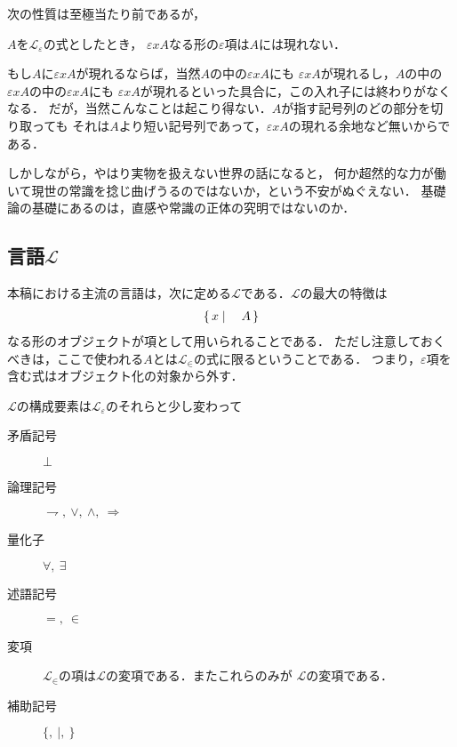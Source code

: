 	次の性質は至極当たり前であるが，
	
	\begin{screen}
		\begin{metathm}[無限入れ子は起こらない]
			$A$を$\mathcal{L}_{\varepsilon}$の式としたとき，
			$\varepsilon x A$なる形の$\varepsilon$項は$A$には現れない．
		\end{metathm}
	\end{screen}
	
	もし$A$に$\varepsilon x A$が現れるならば，当然$A$の中の$\varepsilon x A$にも
	$\varepsilon x A$が現れるし，$A$の中の$\varepsilon x A$の中の$\varepsilon x A$にも
	$\varepsilon x A$が現れるといった具合に，この入れ子には終わりがなくなる．
	だが，当然こんなことは起こり得ない．$A$が指す記号列のどの部分を切り取っても
	それは$A$より短い記号列であって，$\varepsilon x A$の現れる余地など無いからである．
	
	しかしながら，やはり実物を扱えない世界の話になると，
	何か超然的な力が働いて現世の常識を捻じ曲げうるのではないか，という不安がぬぐえない．
	基礎論の基礎にあるのは，直感や常識の正体の究明ではないのか．
	
\subsection{言語$\mathcal{L}$}
	本稿における主流の言語は，次に定める$\mathcal{L}$である．$\mathcal{L}$の最大の特徴は
	\begin{align}
		\left\{\, x \mid \quad A\, \right\}
	\end{align}
	なる形のオブジェクトが項として用いられることである．
	ただし注意しておくべきは，ここで使われる$A$とは$\mathcal{L}_{\in}$の式に限るということである．
	つまり，$\varepsilon$項を含む式はオブジェクト化の対象から外す．
	
	$\mathcal{L}$の構成要素は$\mathcal{L}_{\varepsilon}$のそれらと少し変わって
	
	\begin{description}
		\item[矛盾記号] $\bot$
		\item[論理記号] $\rightharpoondown,\ \vee,\ \wedge,\ \Longrightarrow$
		\item[量化子] $\forall,\ \exists$
		\item[述語記号] $=,\ \in$
		\item[変項] $\mathcal{L}_{\in}$の項は$\mathcal{L}$の変項である．またこれらのみが
			$\mathcal{L}$の変項である．
		\item[補助記号] $\{,\ |,\ \}$
	\end{description}
	
